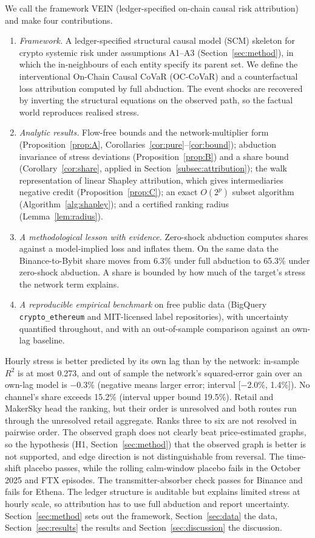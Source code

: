 \documentclass[referee,pdflatex,sn-mathphys-ay]{sn-jnl}
\theoremstyle{thmstyleone}%
\theoremstyle{thmstyletwo}%
\theoremstyle{thmstylethree}%
\begin{document}
We call the framework VEIN (ledger-specified on-chain causal risk attribution) and make four contributions.
\begin{enumerate}[label=(\roman*),leftmargin=*]
\item \emph{Framework.} A ledger-specified structural causal model (SCM) skeleton for crypto
systemic risk under assumptions A1--A3 (Section~\ref{sec:method}), in which the in-neighbours of
each entity specify its parent set. We define the interventional On-Chain Causal CoVaR
(OC-CoVaR) and a counterfactual loss attribution computed by full abduction. The event shocks
are recovered by inverting the structural equations on the observed path, so the factual world
reproduces realised stress.
\item \emph{Analytic results.} Flow-free bounds and the network-multiplier form (Proposition~\ref{prop:A},
Corollaries~\ref{cor:pure}--\ref{cor:bound}); abduction invariance of stress deviations
(Proposition~\ref{prop:B}) and a share bound (Corollary~\ref{cor:share}, applied in Section~\ref{subsec:attribution});
the walk representation of linear Shapley attribution, which gives intermediaries negative credit
(Proposition~\ref{prop:C}); an exact $O(2^p)$ subset algorithm (Algorithm~\ref{alg:shapley}); and a
certified ranking radius (Lemma~\ref{lem:radius}).
\item \emph{A methodological lesson with evidence.} Zero-shock abduction computes shares against a
model-implied loss and inflates them. On the same data the Binance-to-Bybit share moves from
6.3\% under full abduction to 65.3\% under zero-shock abduction. A share
is bounded by how much of the target's stress the network term explains.
\item \emph{A reproducible empirical benchmark} on free public data (BigQuery \texttt{crypto\_ethereum}
and MIT-licensed label repositories), with uncertainty quantified throughout, and with an
out-of-sample comparison against an own-lag baseline.
\end{enumerate}

Hourly stress is better predicted by its own lag than by the network: in-sample $R^2$ is at most
0.273, and out of sample the network's squared-error gain over an
own-lag model is $-$0.3\% (negative means larger error; interval [$-$2.0\%, 1.4\%]). No channel's share
exceeds 15.2\% (interval upper bound 19.5\%). Retail and MakerSky head the ranking, but
their order is unresolved and both routes run through the unresolved retail aggregate. Ranks three to six
are not resolved in pairwise order. The observed graph does not clearly beat price-estimated graphs, so the hypothesis (H1, Section~\ref{sec:method}) that the observed graph is better is
not supported, and edge direction is not distinguishable from reversal. The time-shift placebo passes, while the
rolling calm-window placebo fails in the October 2025 and FTX episodes. The transmitter-absorber check passes for
Binance and fails for Ethena. The ledger structure is auditable but explains limited stress at hourly scale, so
attribution has to use full abduction and report uncertainty. Section~\ref{sec:method} sets out the framework,
Section~\ref{sec:data} the data, Section~\ref{sec:results} the results and Section~\ref{sec:discussion} the discussion.
\end{document}
